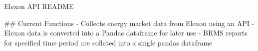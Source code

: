 Elexon API README

## Current Functions
- Collects energy market data from Elexon using an API
- Elexon data is converted into a Pandas dataframe for later use
- BRMS reports for specified time period are collated into a single pandas dataframe 